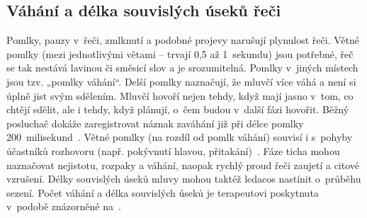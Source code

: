
\subsection{Váhání a délka souvislých úseků řeči}
Pomlky, pauzy v~řeči, zmlknutí a podobné projevy narušují plynulost řeči. Větné pomlky (mezi jednotlivými větami – trvají 0,5 až 1~sekundu) jsou potřebné, řeč se tak nestává lavinou či směsicí slov a je srozumitelná. Pomlky v~jiných místech jsou tzv. „pomlky váhání“. Delší pomlky naznačují, že mluvčí více váhá a není si úplně jist svým sdělením. Mluvčí hovoří nejen tehdy, když mají jasno v~tom, co chtějí sdělit, ale i tehdy, když plánují, o~čem budou v~další fázi hovořit. Běžný posluchač dokáže zaregistrovat náznak zaváhání již při délce pomlky 200~milisekund~\cite{krivohlavy}. Větné pomlky (na rozdíl od pomlk váhání) souvisí i s~pohyby účastníků rozhovoru (např. pokývnutí hlavou, přitakání)~\cite{Dittmann_hesitations}.
Fáze ticha mohou naznačovat nejistotu, rozpaky a váhání, naopak rychlý proud řeči zaujetí a citové vzrušení. Délky souvislých úseků mluvy mohou taktéž ledacos nastínit o~průběhu sezení. Počet váhání a délka souvislých úseků je terapeutovi poskytnuta v~podobě znázorněné na~.

